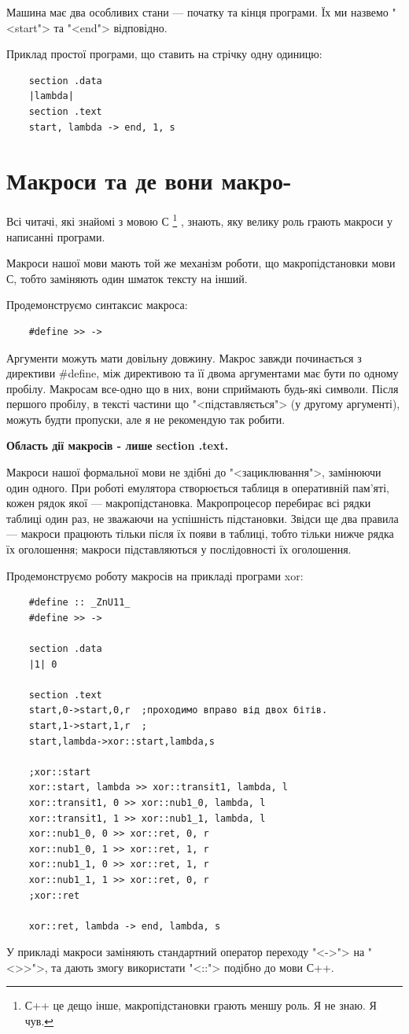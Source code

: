 \documentclass[oneside,final,14pt]{extreport}
\begin{document}
Машина має два особливих стани --- початку та кінця програми. Їх ми назвемо "<start"> та "<end"> відповідно.

Приклад простої програми, що ставить на стрічку одну одиницю:
\begin{verbatim}
	section .data
	|lambda|
	section .text
	start, lambda -> end, 1, s
\end{verbatim}

\section{Макроси та де вони макро-}
Всі читачі, які знайомі з мовою С
\footnote{С++ це дещо інше, макропідстановки грають меншу роль. Я не знаю. Я чув.}
, знають, яку велику роль грають макроси у написанні програми.

Макроси нашої мови мають той же механізм роботи, що макропідстановки мови С, тобто заміняють один шматок тексту на інший.
		
Продемонструємо синтаксис макроса:
		
\begin{verbatim}
	#define >> ->
\end{verbatim}
		
Аргументи можуть мати довільну довжину. Макрос завжди починається з директиви {\ttfamily \#define}, між директивою та її двома аргументами має бути по одному пробілу. Макросам все-одно що в них, вони сприймають будь-які символи. Після першого пробілу, в тексті частини що "<підставляється"> (у другому аргументі), можуть будти пропуски, але я не рекомендую так робити.

{\bfseries		
Область дії макросів - лише section .text. 

Макроси нашої формальної мови не здібні до "<зациклювання">, замінюючи один одного. При роботі емулятора створюється таблиця в оперативній пам'яті, кожен рядок якої --- макропідстановка. Макропроцесор перебирає всі рядки таблиці один раз, не зважаючи на успішність підстановки. Звідси ще два правила --- макроси працюють тільки після їх появи в таблиці, тобто тільки нижче рядка їх оголошення; макроси підставляються у послідовності їх оголошення.
}

Продемонструємо роботу макросів на прикладі програми xor:	
\begin{verbatim}
	#define :: _ZnU11_
	#define >> ->

	section .data
	|1| 0

	section .text
	start,0->start,0,r	;проходимо вправо від двох бітів.
	start,1->start,1,r	;
	start,lambda->xor::start,lambda,s

	;xor::start
	xor::start, lambda >> xor::transit1, lambda, l 
	xor::transit1, 0 >> xor::nub1_0, lambda, l
	xor::transit1, 1 >> xor::nub1_1, lambda, l
	xor::nub1_0, 0 >> xor::ret, 0, r
	xor::nub1_0, 1 >> xor::ret, 1, r
	xor::nub1_1, 0 >> xor::ret, 1, r
	xor::nub1_1, 1 >> xor::ret, 0, r 
	;xor::ret

	xor::ret, lambda -> end, lambda, s
\end{verbatim}
У прикладі макроси заміняють стандартний оператор переходу "<->"> на "<>{}>">, та дають змогу використати "<::"> подібно до мови С++.
		
\end{document}
